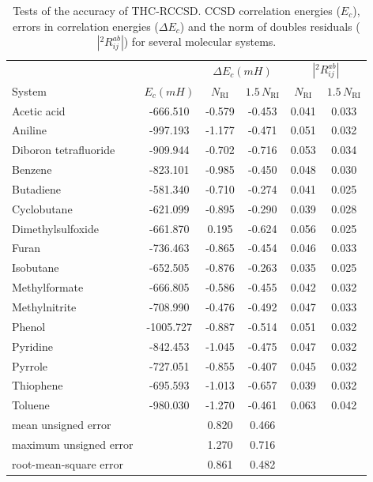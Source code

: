 \begin{center}
\begin{table}[!ht]
\caption{Tests of the accuracy of THC-RCCSD. CCSD correlation energies ($E_c$), 
errors in correlation energies ($\Delta E_c$) and the norm of doubles residuals 
($|{}^2R_{ij}^{ab}|$) for several  
molecular systems. 
\label{tab:energies_thc_rccsd}}
\begin{tabular}{lccccc}
\hline \hline
& & \multicolumn{2}{c}{$\Delta E_c (mH)$} & 
\multicolumn{2}{c}{$|{}^2R_{ij}^{ab}|$}\\
\cline{3-4} \cline{5-6} System & $E_c (mH)$ & $N_\mathrm{RI}$ &
$1.5 \, N_\mathrm{RI}$ & $N_\mathrm{RI}$ &
$1.5 \, N_\mathrm{RI}$\\
\hline
Acetic acid & -666.510 & -0.579 & -0.453 & 0.041 & 0.033 \\
Aniline & -997.193 & -1.177 & -0.471 & 0.051 & 0.032 \\
Diboron tetrafluoride & -909.944 & -0.702 & -0.716 & 0.053 & 0.034\\
Benzene & -823.101 & -0.985 & -0.450 & 0.048 & 0.030\\
Butadiene & -581.340 & -0.710 & -0.274 & 0.041 & 0.025\\
Cyclobutane & -621.099 & -0.895 & -0.290 & 0.039 & 0.028\\
Dimethylsulfoxide & -661.870 & 0.195 & -0.624 & 0.056 & 0.025\\
Furan & -736.463 & -0.865 & -0.454 & 0.046 & 0.033\\
Isobutane & -652.505 & -0.876 & -0.263 & 0.035 & 0.025\\
Methylformate & -666.805 & -0.586 & -0.455 & 0.042 & 0.032\\
Methylnitrite & -708.990 & -0.476 & -0.492 & 0.047 & 0.033\\
Phenol & -1005.727 & -0.887 & -0.514 & 0.051 & 0.032\\
Pyridine & -842.453 & -1.045 & -0.475 & 0.047 & 0.032\\
Pyrrole & -727.051 & -0.855 & -0.407 & 0.045 & 0.032\\
Thiophene & -695.593 & -1.013 & -0.657 & 0.039 & 0.032\\
Toluene & -980.030 & -1.270 & -0.461 & 0.063 & 0.042\\
\hline
mean unsigned error & & 0.820 & 0.466 & &\\
maximum unsigned error & & 1.270 & 0.716 & &\\
root-mean-square error & & 0.861 & 0.482 & &\\
\hline\hline
\end{tabular}
\end{table}
\end{center}
